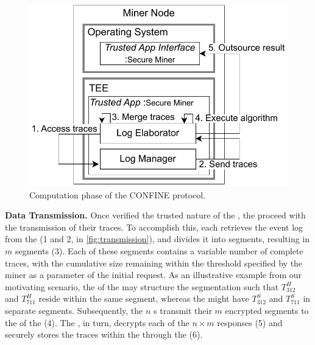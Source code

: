 \begin{figure}
	\vspace{-2em}
	\includegraphics[width=1\textwidth]{content/figures/computationworkflow2.pdf}
	\caption[A gull]{Computation phase of the CONFINE protocol.}
	\vspace{-2pt}
	\label{fig:workflow2}
\end{figure}
\textbf{Data Transmission.} Once verified the trusted nature of the , the  proceed with the transmission of their traces. To accomplish this, each  retrieves the event log from the  (1 and 2, in \cref{fig:transmission}), and divides it into segments, resulting in $m$ segments (3). Each of these segments contains a variable number of complete traces, with the cumulative size remaining within the threshold specified by the miner as a parameter of the initial request. As an illustrative example from our motivating scenario, the  of the  may structure the segmentation such that $T^H_{312}$ and $T^H_{711}$ reside within the same segment, whereas the  might have $T^S_{312}$ and $T^S_{711}$ in separate segments. Subsequently, the $n$ s transmit their $m$ encrypted segments to the  of the  (4). The , in turn, decrypts each of the $n \times m$ responses (5) and securely stores the traces within the  through the  (6).

